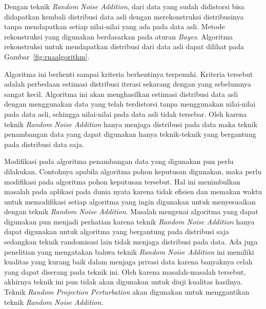 \documentclass[a4paper,twoside]{article}
\begin{document}
\begin{enumerate}
		Dengan teknik \textit{Random Noise Addition}, dari data yang sudah didistorsi bisa didapatkan kembali distribusi data asli dengan merekonstruksi distribusinya tanpa mendapatkan setiap nilai-nilai yang ada pada data asli. Metode rekonstruksi yang digunakan berdasarkan pada aturan \textit{Bayes}. Algoritma rekonstruksi untuk mendapatkan distribusi dari data asli dapat dilihat pada Gambar~\ref{fig:rnaalgorithm}.
		
	

		Algoritma ini berhenti sampai kriteria berhentinya terpenuhi. Kriteria tersebut adalah perbedaan estimasi distribusi iterasi sekarang dengan yang sebelumnya sangat kecil. Algoritma ini akan menghasilkan estimasi distribusi data asli dengan menggunakan data yang telah terdistorsi tanpa menggunakan nilai-nilai pada data asli, sehingga nilai-nilai pada data asli tidak tersebar. Oleh karena teknik \textit{Random Noise Addition} hanya menjaga distribusi pada data maka teknik penambangan data yang dapat digunakan hanya teknik-teknik yang bergantung pada distribusi data saja.

		Modifikasi pada algoritma penambangan data yang digunakan pun perlu dilakukan. Contohnya apabila algoritma pohon keputusan digunakan, maka perlu modifikasi pada algoritma pohon keputusan tersebut. Hal ini menimbulkan masalah pada aplikasi pada dunia nyata karena tidak efisien dan memakan waktu untuk memodifikasi setiap algoritma yang ingin digunakan untuk menyesuaikan dengan teknik \textit{Random Noise Addition}. Masalah mengenai algoritma yang dapat digunakan pun menjadi perhatian karena teknik \textit{Random Noise Addition} hanya dapat digunakan untuk algoritma yang bergantung pada distribusi saja sedangkan teknik randomisasi lain tidak menjaga distribusi pada data. Ada juga penelitian yang mengatakan bahwa teknik \textit{Random Noise Addition} ini memiliki kualitas yang kurang baik dalam menjaga privasi data karena banyaknya celah yang dapat diserang pada teknik ini. Oleh karena masalah-masalah tersebut, akhirnya teknik ini pun tidak akan digunakan untuk diuji kualitas hasilnya. Teknik \textit{Random Projection Perturbation} akan digunakan untuk menggantikan teknik \textit{Random Noise Addition}.


\end{enumerate}
\end{document}
